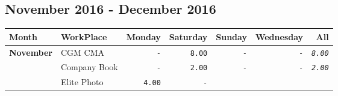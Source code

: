 \documentclass[11pt,A4paper,]{article}
\begin{document}
\clearpage

\subsection{November 2016 - December
2016}\label{november-2016---december-2016}

\begin{longtable}[]{@{}llrrrrr@{}}
\toprule
Month & WorkPlace & Monday & Saturday & Sunday & Wednesday &
All\tabularnewline
\midrule
\endhead
\textbf{November} & CGM CMA & \texttt{-} & \texttt{8.00} & \texttt{-} &
\texttt{-} & \emph{\texttt{8.00}}\tabularnewline
\begin{minipage}[t]{0.14\columnwidth}\raggedright\strut
\strut
\end{minipage} & \begin{minipage}[t]{0.14\columnwidth}\raggedright\strut
Company Book\strut
\end{minipage} & \begin{minipage}[t]{0.14\columnwidth}\raggedleft\strut
\texttt{-}\strut
\end{minipage} & \begin{minipage}[t]{0.14\columnwidth}\raggedleft\strut
\texttt{2.00}\strut
\end{minipage} & \begin{minipage}[t]{0.14\columnwidth}\raggedleft\strut
\texttt{-}\strut
\end{minipage} & \begin{minipage}[t]{0.14\columnwidth}\raggedleft\strut
\texttt{-}\strut
\end{minipage} & \begin{minipage}[t]{0.14\columnwidth}\raggedleft\strut
\emph{\texttt{2.00}}\strut
\end{minipage}\tabularnewline
\begin{minipage}[t]{0.14\columnwidth}\raggedright\strut
\strut
\end{minipage} & \begin{minipage}[t]{0.14\columnwidth}\raggedright\strut
Elite Photo\strut
\end{minipage} & \begin{minipage}[t]{0.14\columnwidth}\raggedleft\strut
\texttt{4.00}\strut
\end{minipage} & \begin{minipage}[t]{0.14\columnwidth}\raggedleft\strut
\texttt{-}\strut
\end{minipage} & \begin{minipage}[t]{0.14\columnwidth}\raggedleft\strut

\end{minipage}
\end{longtable}
\end{document}
